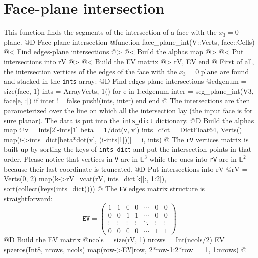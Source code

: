 \documentclass[10pt,oneside]{article}
\begin{document}
\section{Face-plane intersection}
This function finds the segments of the intersection of a face with the $x_3=0$ plane.
@D Face-plane intersection
@{function face_plane_int(V::Verts, face::Cells)
    @< Find edges-plane intersections @>
    @< Build the alphas map @>
    @< Put intersections into rV @>
    @< Build the EV matrix @>
    rV, EV
end
@}
First of all, the intersection vertices of the edges of the face with the $x_3=0$ plane are found and stacked in the \texttt{ints} array:
@D Find edges-plane intersections
@{edgenum = size(face, 1)
ints = Array{Verts, 1}()
for e in 1:edgenum
    inter = seg_plane_int(V3, face[e, :])
    if inter != false
        push!(ints, inter)
    end
end
@}
The intersections are then parameterized over the line on which all the intersection lay (the input face is for sure planar).
The data is put into the \texttt{ints\_dict} dictionary.
@D Build the alphas map
@{v = ints[2]-ints[1]
beta = 1/dot(v, v')
ints_dict = Dict{Float64, Verts}()
map(i->ints_dict[beta*dot(v', (i-ints[1]))] = i, ints)
@}
The \texttt{rV} vertices matrix is built up by sorting the keys of \texttt{ints\_dict} and put the intersection points in that order.
Please notice that vertices in \texttt{V} are in $\mathbb{E}^3$ while the ones into \texttt{rV} are in $\mathbb{E}^2$ because
their last coordinate is truncated.
@D Put intersections into rV
@{rV = Verts(0, 2)
map(k->rV=vcat(rV, ints_dict[k][:, 1:2]), sort(collect(keys(ints_dict))))
@}
The \texttt{EV} edges matrix structure is straightforward:
\[
    \texttt{EV} = 
    \begin{pmatrix}
        1 & 1 & 0 & 0 & \cdots & 0 & 0 \\
        0 & 0 & 1 & 1 & \cdots & 0 & 0 \\
        \vdots & \vdots & \vdots & \vdots & \ddots & \vdots & \vdots \\
        0 & 0 & 0 & 0 & \cdots & 1 & 1
    \end{pmatrix}
\]
@D Build the EV matrix
@{ncols = size(rV, 1)
nrows = Int(ncols/2)
EV = spzeros(Int8, nrows, ncols)
map(row->EV[row, 2*row-1:2*row] = 1, 1:nrows)
@}



\end{document}
